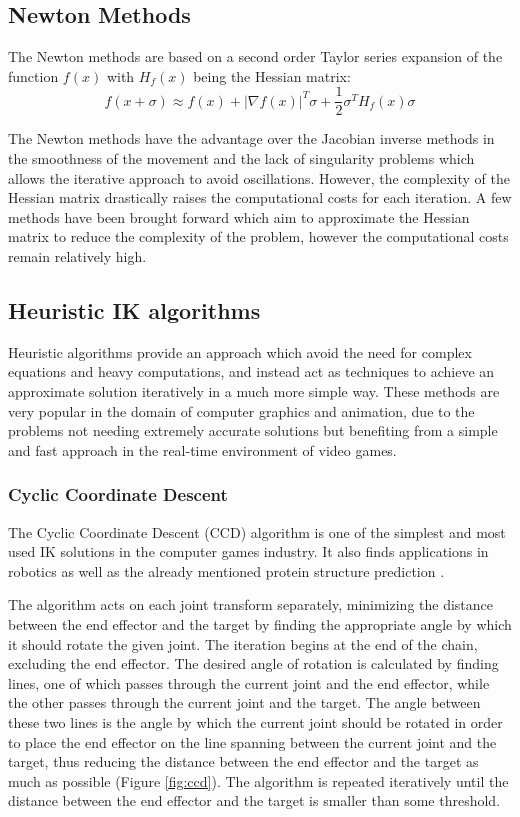 \subsection{Newton Methods}
The Newton methods are based on a second order Taylor series expansion of the
function \(f(x)\) with \(H_f(x)\) being the Hessian matrix:
\begin{equation}
    f(x + \sigma) \approx f(x) + |\nabla f(x)|^T \sigma + \frac{1}{2} \sigma^T H_f(x)
    \sigma
\end{equation}

The Newton methods have the advantage over the Jacobian inverse methods in the
smoothness of the movement and the lack of singularity problems which allows the
iterative approach to avoid oscillations. However, the complexity of the Hessian
matrix drastically raises the computational costs for each iteration. A few
methods have been brought forward which aim to approximate the Hessian matrix
to reduce the complexity of the problem, however the computational costs remain
relatively high.

\subsection{Heuristic IK algorithms}
Heuristic algorithms provide an approach which avoid the need for complex
equations and heavy computations, and instead act as techniques to achieve an
approximate solution iteratively in a much more simple way. These methods are
very popular in the domain of computer graphics and animation, due to the
problems not needing extremely accurate solutions but benefiting from a simple
and fast approach in the real-time environment of video games.

\subsubsection{Cyclic Coordinate Descent}
The Cyclic Coordinate Descent (CCD) algorithm \cite{ccd} is one of the simplest and most
used IK solutions in the computer games industry. It also finds
applications in robotics as well as the already mentioned protein structure
prediction \cite{ccd_protein}. 

The algorithm acts on each joint transform separately, minimizing the distance
between the end effector and the target by finding the appropriate angle by
which it should rotate the given joint. The iteration begins at the end of the
chain, excluding the end effector. The desired angle of rotation is calculated by
finding lines, one of which passes through the current joint and the end
effector, while the other passes through the current joint and the target. The
angle between these two lines is the angle by which the current joint should
be rotated in order to place the end effector on the line spanning between the
current joint and the target, thus reducing the distance between the end
effector and the target as much as possible (Figure \ref{fig:ccd}). The
algorithm is repeated iteratively until the distance between the end effector
and the target is smaller than some threshold.

